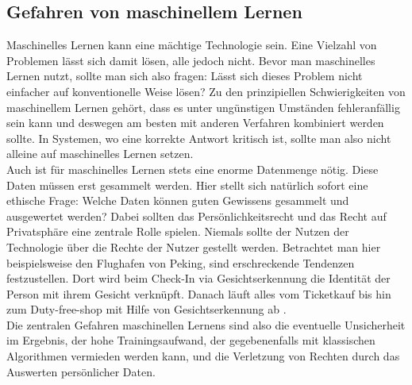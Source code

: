 \documentclass[11pt]{article}
\begin{document}
\subsection{Gefahren von maschinellem Lernen}
Maschinelles Lernen kann eine mächtige Technologie sein. Eine Vielzahl von Problemen lässt sich damit lösen, alle jedoch nicht. Bevor man maschinelles Lernen nutzt, sollte man sich also fragen: Lässt sich dieses Problem nicht einfacher auf konventionelle Weise lösen? Zu den prinzipiellen Schwierigkeiten von maschinellem Lernen gehört, dass es unter ungünstigen Umständen fehleranfällig sein kann und deswegen am besten mit anderen Verfahren kombiniert werden sollte. In Systemen, wo eine korrekte Antwort kritisch ist, sollte man also nicht alleine auf maschinelles Lernen setzen.\\
Auch ist für maschinelles Lernen stets eine enorme Datenmenge nötig. Diese Daten müssen erst gesammelt werden. Hier stellt sich natürlich sofort eine ethische Frage: Welche Daten können guten Gewissens gesammelt und ausgewertet werden? Dabei sollten das Persönlichkeitsrecht und das Recht auf Privatsphäre eine zentrale Rolle spielen. Niemals sollte der Nutzen der Technologie über die Rechte der Nutzer gestellt werden. Betrachtet man hier beispielsweise den Flughafen von Peking, sind erschreckende Tendenzen festzustellen. Dort wird beim Check-In via Gesichtserkennung die Identität der Person mit ihrem Gesicht verknüpft. Danach läuft alles vom Ticketkauf bis hin zum Duty-free-shop mit Hilfe von Gesichtserkennung ab \cite{4}.\\
Die zentralen Gefahren maschinellen Lernens sind also die eventuelle Unsicherheit im Ergebnis, der hohe Trainingsaufwand, der gegebenenfalls mit klassischen Algorithmen vermieden werden kann, und die Verletzung von Rechten durch das Auswerten persönlicher Daten.
\end{document}
